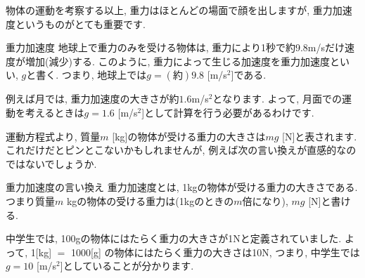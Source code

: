 \documentclass[11pt,dvipdfmx]{jsarticle}
\numberwithin{equation}{section} %
\begin{document}
物体の運動を考察する以上, 重力はほとんどの場面で顔を出しますが, 重力加速度というものがとても重要です.
\begin{freebox}{重力加速度}
   地球上で重力のみを受ける物体は, 重力により1秒で約9.8m/sだけ速度が増加(減少)する. このように, 重力によって生じる加速度を重力加速度といい, $g$と書く. つまり, 地球上では$g = (約)9.8$ [m/s$^2$]である.
\end{freebox}
例えば月では, 重力加速度の大きさが約$1.6$m/s$^2$となります. よって, 月面での運動を考えるときは$g = 1.6$ [m/s$^2$]として計算を行う必要があるわけです.


運動方程式より, 質量$m$ [kg]の物体が受ける重力の大きさは$mg$ [N]と表されます. これだけだとピンとこないかもしれませんが, 例えば次の言い換えが直感的なのではないでしょうか.
\begin{freebox}{重力加速度の言い換え}
    重力加速度とは, 1kgの物体が受ける重力の大きさである. つまり質量$m$ kgの物体の受ける重力は(1kgのときの$m$倍になり), $mg$ [N]と書ける.
\end{freebox}
中学生では, 100gの物体にはたらく重力の大きさが1Nと定義されていました. よって, 1[kg] $=$ 1000[g] の物体にはたらく重力の大きさは10N, つまり, 中学生では$g = 10$ [m/s$^2$]としていることが分かります. 
\end{document}
